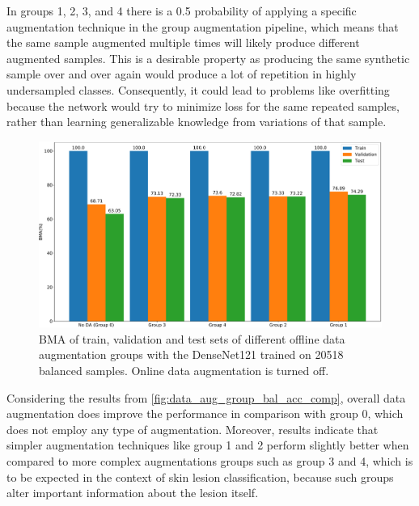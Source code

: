     In groups 1, 2, 3, and 4 there is a 0.5 probability of applying a specific augmentation technique in the group augmentation pipeline, which means that the same sample augmented multiple times will likely produce different augmented samples. This is a desirable property as producing the same synthetic sample over and over again would produce a lot of repetition in highly undersampled classes. Consequently, it could lead to problems like overfitting because the network would try to minimize loss for the same repeated samples, rather than learning generalizable knowledge from variations of that sample. \par
    
    \begin{figure}[ht]
        \centering
        \includegraphics[width=\textwidth]{figs/data_aug_group_bal_acc_comp.pdf}
        \caption[\ac{BMA} of train, validation and test sets of different offline data augmentation groups with the DenseNet121 trained on 20518 balanced samples.]{\ac{BMA} of train, validation and test sets of different offline data augmentation groups with the DenseNet121 trained on 20518 balanced samples. Online data augmentation is turned off.}
        \label{fig:data_aug_group_bal_acc_comp}
    \end{figure}
    
    Considering the results from \autoref{fig:data_aug_group_bal_acc_comp}, overall data augmentation does improve the performance in comparison with group 0, which does not employ any type of augmentation. Moreover, results indicate that simpler augmentation techniques like group 1 and 2 perform slightly better when compared to more complex augmentations groups such as group 3 and 4, which is to be expected in the context of skin lesion classification, because such groups alter important information about the lesion itself. \par
    
